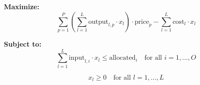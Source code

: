 \documentclass{article}
\begin{document}
\textbf{Maximize:}
\[
\sum_{p=1}^{P} \left( \sum_{l=1}^{L} \text{output}_{l,p} \cdot x_l \right) \cdot \text{price}_p - \sum_{l=1}^{L} \text{cost}_l \cdot x_l
\]

\textbf{Subject to:}
\[
\sum_{l=1}^{L} \text{input}_{l,i} \cdot x_l \leq \text{allocated}_i \quad \text{for all } i = 1, \ldots, O
\]

\[
x_l \geq 0 \quad \text{for all } l = 1, \ldots, L
\]
\end{document}
